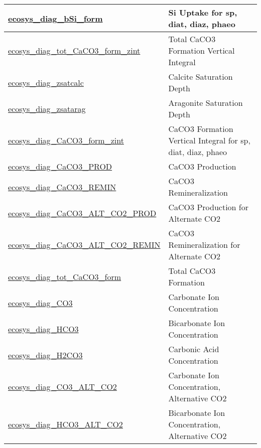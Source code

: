 {\begin{center}
\begin{longtable}{| p{2.0in} | p{4.0in} |}
    \hline
    \hyperref[subsec:var_sec_forcing_ecosys_diag_bSi_form]{ecosys\_diag\_bSi\_form} & Si Uptake for sp, diat, diaz, phaeo \\
    \hline
    \hyperref[subsec:var_sec_forcing_ecosys_diag_tot_CaCO3_form_zint]{ecosys\_diag\_tot\_CaCO3\_form\_\-zint} & Total CaCO3 Formation Vertical Integral \\
    \hline
    \hyperref[subsec:var_sec_forcing_ecosys_diag_zsatcalc]{ecosys\_diag\_zsatcalc} & Calcite Saturation Depth \\
    \hline
    \hyperref[subsec:var_sec_forcing_ecosys_diag_zsatarag]{ecosys\_diag\_zsatarag} & Aragonite Saturation Depth \\
    \hline
    \hyperref[subsec:var_sec_forcing_ecosys_diag_CaCO3_form_zint]{ecosys\_diag\_CaCO3\_form\_zint} & CaCO3 Formation Vertical Integral for sp, diat, diaz, phaeo \\
    \hline
    \hyperref[subsec:var_sec_forcing_ecosys_diag_CaCO3_PROD]{ecosys\_diag\_CaCO3\_PROD} & CaCO3 Production \\
    \hline
    \hyperref[subsec:var_sec_forcing_ecosys_diag_CaCO3_REMIN]{ecosys\_diag\_CaCO3\_REMIN} & CaCO3 Remineralization \\
    \hline
    \hyperref[subsec:var_sec_forcing_ecosys_diag_CaCO3_ALT_CO2_PROD]{ecosys\_diag\_CaCO3\_ALT\_\-CO2\_PROD} & CaCO3 Production for Alternate CO2 \\
    \hline
    \hyperref[subsec:var_sec_forcing_ecosys_diag_CaCO3_ALT_CO2_REMIN]{ecosys\_diag\_CaCO3\_ALT\_\-CO2\_REMIN} & CaCO3 Remineralization for Alternate CO2 \\
    \hline
    \hyperref[subsec:var_sec_forcing_ecosys_diag_tot_CaCO3_form]{ecosys\_diag\_tot\_CaCO3\_form} & Total CaCO3 Formation \\
    \hline
    \hyperref[subsec:var_sec_forcing_ecosys_diag_CO3]{ecosys\_diag\_CO3} & Carbonate Ion Concentration \\
    \hline
    \hyperref[subsec:var_sec_forcing_ecosys_diag_HCO3]{ecosys\_diag\_HCO3} & Bicarbonate Ion Concentration \\
    \hline
    \hyperref[subsec:var_sec_forcing_ecosys_diag_H2CO3]{ecosys\_diag\_H2CO3} & Carbonic Acid Concentration \\
    \hline
    \hyperref[subsec:var_sec_forcing_ecosys_diag_CO3_ALT_CO2]{ecosys\_diag\_CO3\_ALT\_CO2} & Carbonate Ion Concentration, Alternative CO2 \\
    \hline
    \hyperref[subsec:var_sec_forcing_ecosys_diag_HCO3_ALT_CO2]{ecosys\_diag\_HCO3\_ALT\_CO2} & Bicarbonate Ion Concentration, Alternative CO2 \\

\end{longtable}
\end{center}}
